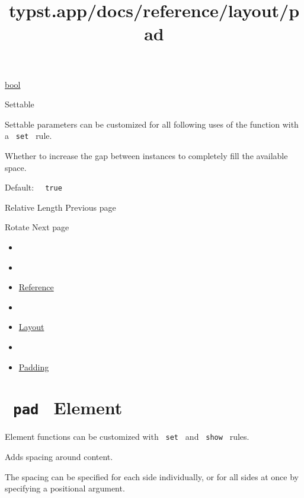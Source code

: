 \href{/docs/reference/foundations/bool/}{bool}

{{ Settable }}

\label{parameters-justify-settable-tooltip}
Settable parameters can be customized for all following uses of the
function with a \texttt{\ set\ } rule.

Whether to increase the gap between instances to completely fill the
available space.

Default: \texttt{\ }{\texttt{\ true\ }}\texttt{\ }

\href{/docs/reference/layout/relative/}{\pandocbounded{}}

{ Relative Length } { Previous page }

\href{/docs/reference/layout/rotate/}{\pandocbounded{}}

{ Rotate } { Next page }


\title{typst.app/docs/reference/layout/pad}

\begin{itemize}
\tightlist
\item
  \href{/docs}{}
\item
  
\item
  \href{/docs/reference/}{Reference}
\item
  
\item
  \href{/docs/reference/layout/}{Layout}
\item
  
\item
  \href{/docs/reference/layout/pad/}{Padding}
\end{itemize}

\section{\texorpdfstring{\texttt{\ pad\ } {{ Element
}}}{ pad   Element }}\label{summary}

\label{element-tooltip}
Element functions can be customized with \texttt{\ set\ } and
\texttt{\ show\ } rules.

Adds spacing around content.

The spacing can be specified for each side individually, or for all
sides at once by specifying a positional argument.

